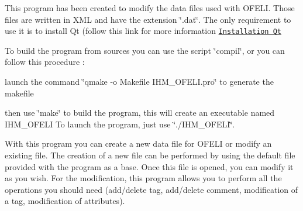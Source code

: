 This program has been created to modify the data files used with O\-F\-E\-L\-I. Those files are written in X\-M\-L and have the extension \char`\"{}.\-dat\char`\"{}. The only requirement to use it is to install Qt (follow this link for more information \href{http://qt-project.org/doc/qt-4.8/installation.html}{\tt Installation Qt}

To build the program from sources you can use the script \char`\"{}compil\char`\"{}, or you can follow this procedure \-:
\begin{DoxyItemize}
\item launch the command \char`\"{}qmake -\/o Makefile I\-H\-M\-\_\-\-O\-F\-E\-L\-I.\-pro\char`\"{} to generate the makefile
\item then use \char`\"{}make\char`\"{} to build the program, this will create an executable named I\-H\-M\-\_\-\-O\-F\-E\-L\-I To launch the program, just use \char`\"{}./\-I\-H\-M\-\_\-\-O\-F\-E\-L\-I\char`\"{}.
\end{DoxyItemize}

With this program you can create a new data file for O\-F\-E\-L\-I or modify an existing file. The creation of a new file can be performed by using the default file provided with the program as a base. Once this file is opened, you can modify it as you wish. For the modification, this program allows you to perform all the operations you should need (add/delete tag, add/delete comment, modification of a tag, modification of attributes). 